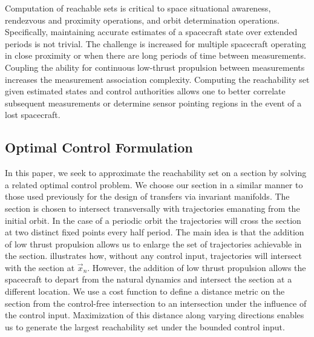 \documentclass[preprint]{elsarticle}
\begin{document}
Computation of reachable sets is critical to space situational awareness, rendezvous and proximity operations, and orbit determination operations.
Specifically, maintaining accurate estimates of a spacecraft state over extended periods is not trivial.
The challenge is increased for multiple spacecraft operating in close proximity or when there are long periods of time between measurements.
Coupling the ability for continuous low-thrust propulsion between measurements increases the measurement association complexity.
Computing the reachability set given estimated states and control authorities allows one to better correlate subsequent measurements or determine sensor pointing regions in the event of a lost spacecraft. 

\subsection{Optimal Control Formulation}\label{sec:optimal_control}
In this paper, we seek to approximate the reachability set on a \Poincare section by solving a related optimal control problem. 
We choose our \Poincare section in a similar manner to those used previously for the design of transfers via invariant manifolds.
The \Poincare section is chosen to intersect transversally with trajectories emanating from the initial orbit. 
In the case of a periodic orbit the trajectories will cross the \Poincare section at two distinct fixed points every half period.
The main idea is that the addition of low thrust propulsion allows us to enlarge the set of trajectories achievable in the \Poincare section. 
 illustrates how, without any control input, trajectories will intersect with the \Poincare section at \( \vec{x}_n \). 
However, the addition of low thrust propulsion allows the spacecraft to depart from the natural dynamics and intersect the \Poincare section at a different location.
We use a cost function to define a distance metric on the \Poincare section from the control-free intersection to an intersection under the influence of the control input.
Maximization of this distance along varying directions enables us to generate the largest reachability set under the bounded control input.
\end{document}
